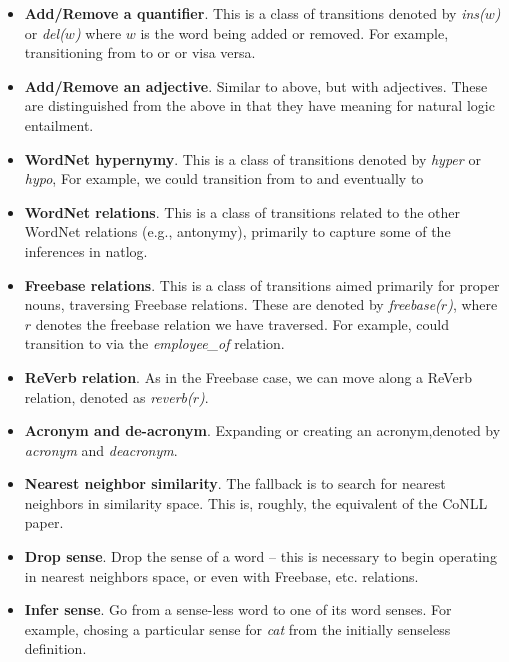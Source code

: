 \begin{itemize}
\item \textbf{Add/Remove a quantifier}.
      This is a class of transitions denoted by
      \textit{ins($w$)} or \textit{del($w$)} 
      where $w$ is the word being added or removed.
      For example, transitioning from  to
       or  or visa versa.
\item \textbf{Add/Remove an adjective}.
      Similar to above, but with adjectives. These are distinguished
      from the above in that they have meaning for natural logic
      entailment.
\item \textbf{WordNet hypernymy}.
      This is a class of transitions denoted by
      \textit{hyper} or \textit{hypo},
      For example, we could transition from 
      to  and eventually to 
\item \textbf{WordNet relations}.
      This is a class of transitions related to the other
      WordNet relations (e.g., antonymy), primarily to
      capture some of the inferences in natlog.
\item \textbf{Freebase relations}.
      This is a class of transitions aimed primarily
      for proper nouns, traversing Freebase relations.
      These are denoted by \textit{freebase($r$)},
      where $r$ denotes the freebase relation we
      have traversed.
      For example,  could transition
      to  via the \textit{employee\_of}
      relation.
\item \textbf{ReVerb relation}.
      As in the Freebase case, we can move along a
      ReVerb relation, denoted as \textit{reverb($r$)}.
\item \textbf{Acronym and de-acronym}.
      Expanding or creating an acronym,denoted by
      \textit{acronym} and \textit{deacronym}.
\item \textbf{Nearest neighbor similarity}.
      The fallback is to search for nearest neighbors in similarity space.
      This is, roughly, the equivalent of the CoNLL paper.
\item \textbf{Drop sense}. Drop the sense of a word -- this is necessary to
      begin operating in nearest neighbors space, or even with Freebase, etc.
      relations.
\item \textbf{Infer sense}. Go from a sense-less word to one of its word senses.
      For example, chosing a particular sense for \textit{cat} from the
        initially senseless definition.
\end{itemize}

